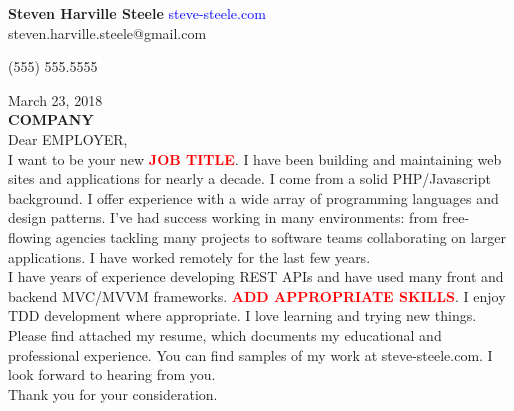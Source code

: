 \documentclass[11pt]{ncsuthesis4}
\newcommand{\tab}{\hspace*{20em}}
\begin{document}
\oddsidemargin 0.25in
\evensidemargin 0.25in
\textwidth 6.0in
\topmargin 0.25in
\textheight 8.0in
\renewcommand{\baselinestretch}{2}
\renewcommand{\headrulewidth}{0pt}
\thispagestyle{empty}
\rhead{\thepage}
\setlength{\headsep}{0in}
\setlength{\parindent}{2em}




\noindent \textbf{\Large Steven Harville Steele} \hfill \textcolor{blue}{steve-steele.com}
\\

\hfill steven.harville.steele@gmail.com

\hfill (555) 555.5555

\noindent March 23, 2018\\%

\noindent \textbf{COMPANY}\\%

\noindent Dear EMPLOYER,%
\\

\noindent
I want to be your new \textcolor{red}{\textbf{JOB TITLE}}. I have been building and maintaining web sites and applications for nearly a decade. I come from a solid PHP/Javascript background. I offer experience with a wide array of programming languages and design patterns. I've had success working in many environments: from free-flowing agencies tackling many projects to software teams collaborating on larger applications. I have worked remotely for the last few years.
\\

\noindent
I have years of experience developing REST APIs and have used many front and backend MVC/MVVM frameworks. \textcolor{red}{\textbf{ADD APPROPRIATE SKILLS}}. I enjoy TDD development where appropriate. I love learning and trying new things.
\\

\noindent Please find attached my resume, which documents my educational and professional experience. You can find samples of my work at steve-steele.com. I look forward to hearing from you.
\\

\noindent Thank you for your consideration.
\\

\tab{Sincerely,}

\tab{Steve Steele}




\nocite{*}
\end{document}
